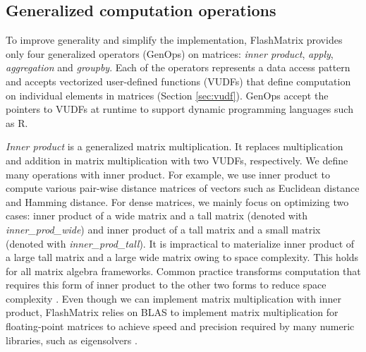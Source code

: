 


\subsection{Generalized computation operations} \label{sec:genop}
To improve generality and simplify the implementation, FlashMatrix provides
only four generalized operators (GenOps) on matrices: \textit{inner product},
\textit{apply}, \textit{aggregation} and \textit{groupby}. Each of the operators
represents a data access pattern and accepts vectorized user-defined functions
(VUDFs) that define computation on individual elements in matrices (Section
\ref{sec:vudf}). GenOps accept the pointers to VUDFs at runtime to support
dynamic programming languages such as R.

\textit{Inner product} is a generalized matrix multiplication. It replaces
multiplication and addition in matrix multiplication with two VUDFs,
respectively. We define many operations
with inner product. For example, we use inner product to compute various
pair-wise distance matrices of vectors such as Euclidean distance and
Hamming distance. For dense matrices, we mainly focus on
optimizing two cases: inner product of a wide matrix and a tall matrix (denoted
with \textit{inner\_prod\_wide}) and inner product of a tall matrix and a small
matrix (denoted with \textit{inner\_prod\_tall}). It is impractical to
materialize inner product of a large tall matrix and a large wide matrix owing
to space complexity. This holds for all matrix algebra frameworks. Common
practice transforms computation that requires this form of inner product to
the other two forms to reduce space complexity \cite{}.
Even though we can implement matrix multiplication with inner product,
FlashMatrix relies on BLAS to implement matrix multiplication for
floating-point matrices to achieve speed and precision required by
many numeric libraries, such as eigensolvers \cite{anasazi, FlashEigen}.

